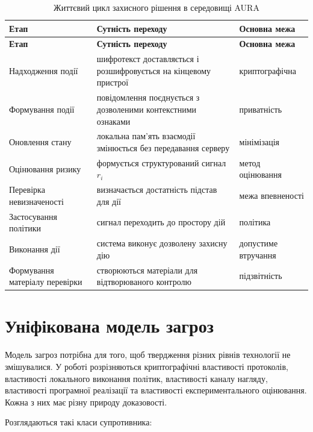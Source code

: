 \begin{longtable}{p{3.6cm} p{6.6cm} p{2.8cm}}
\caption{Життєвий цикл захисного рішення в середовищі AURA}
\label{tab:decision-lifecycle}\\
\toprule
\textbf{Етап} & \textbf{Сутність переходу} & \textbf{Основна межа} \\
\midrule
\endfirsthead
\toprule
\textbf{Етап} & \textbf{Сутність переходу} & \textbf{Основна межа} \\
\midrule
\endhead
Надходження події & шифротекст доставляється і розшифровується на кінцевому пристрої & криптографічна \\
Формування події & повідомлення поєднується з дозволеними контекстними ознаками & приватність \\
Оновлення стану & локальна пам'ять взаємодії змінюється без передавання серверу & мінімізація \\
Оцінювання ризику & формується структурований сигнал \(r_i\) & метод оцінювання \\
Перевірка невизначеності & визначається достатність підстав для дії & межа впевненості \\
Застосування політики & сигнал переходить до простору дій & політика \\
Виконання дії & система виконує дозволену захисну дію & допустиме втручання \\
Формування матеріалу перевірки & створюються матеріали для відтворюваного контролю & підзвітність \\
\bottomrule
\end{longtable}

\section{Уніфікована модель загроз}
\label{sec:threat-model}

Модель загроз потрібна для того, щоб твердження різних рівнів технології не змішувалися. У роботі розрізняються криптографічні властивості протоколів, властивості локального виконання політик, властивості каналу нагляду, властивості програмної реалізації та властивості експериментального оцінювання. Кожна з них має різну природу доказовості.

Розглядаються такі класи супротивника:

